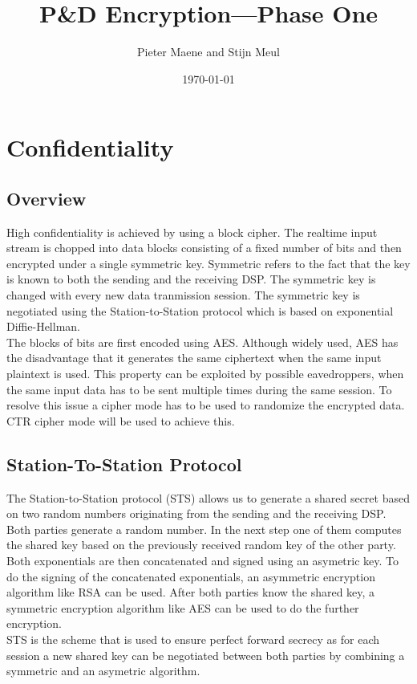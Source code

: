 \documentclass[a4paper]{article}
\title{P\&D Encryption---Phase One}
\author{Pieter Maene and Stijn Meul}
\date{\today}
\begin{document}
\maketitle

\section{Confidentiality}

\subsection{Overview}
High confidentiality is achieved by using a block cipher. The realtime input stream is chopped into data blocks consisting of a fixed number of bits and then encrypted under a single symmetric key. Symmetric refers to the fact that the key is known to both the sending and the receiving DSP. The symmetric key is changed with every new data tranmission session. The symmetric key is negotiated using the Station-to-Station protocol which is based on exponential Diffie-Hellman.\\

The blocks of bits are first encoded using AES. Although widely used, AES has the disadvantage that it generates the same ciphertext when the same input plaintext is used. This property can be exploited by possible eavedroppers, when the same input data has to be sent multiple times during the same session. To resolve this issue a cipher mode has to be used to randomize the encrypted data. CTR cipher mode will be used to achieve this. 

\subsection{Station-To-Station Protocol}
The Station-to-Station protocol (STS) allows us to generate a shared secret based on two random numbers originating from the sending and the receiving DSP. Both parties generate a random number. In the next step one of them computes the shared key based on the previously received random key of the other party. Both exponentials are then concatenated and signed using an asymetric key. To do the signing of the concatenated exponentials, an asymmetric encryption algorithm like RSA can be used. After both parties know the shared key, a symmetric encryption algorithm like AES can be used to do the further encryption.\\

STS is the scheme that is used to ensure perfect forward secrecy as for each session a new shared key can be negotiated between both parties by combining a symmetric and an asymetric algorithm.
\end{document}
